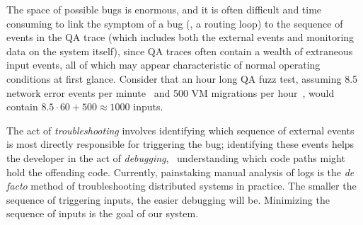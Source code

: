 The space of possible bugs is enormous, and it is often difficult and time
consuming to link the
symptom of a bug (\eg, a routing loop) to the sequence of events in the QA
trace (which includes both the external events and monitoring data on the
system itself), since QA traces often contain a wealth
of extraneous input events, all of which may appear characteristic of normal
operating conditions at first glance. Consider that an hour long QA fuzz test, assuming 8.5 network error events per
minute~\cite{Greenberg:2009:VSF:1592568.1592576} and 500 VM migrations per
hour~\cite{Soundararajan:2010:CBS:1899928.1899941},
would contain $8.5 \cdot 60 + 500 \approx 1000$ inputs.

The act of {\em troubleshooting} involves identifying which sequence of
external events is most directly responsible for triggering the bug;
identifying these events helps the developer in the act of {\em debugging},
\ie~understanding which code paths might
hold the offending code. Currently, painstaking manual analysis of logs is the {\em de facto} method of troubleshooting distributed systems in practice.
The smaller the sequence of triggering inputs, the easier debugging will
be. Minimizing the sequence of inputs is the goal of our system.

